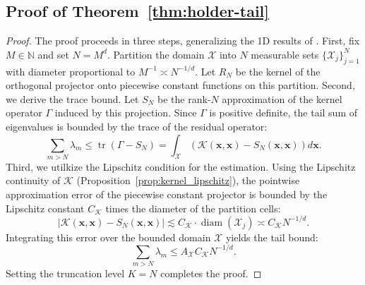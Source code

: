 \documentclass{article}
\theoremstyle{plain}
\theoremstyle{definition}
\theoremstyle{remark}
\begin{document}
\subsection{Proof of Theorem~\ref{thm:holder-tail}}
\begin{proof}The proof proceeds in three steps, generalizing the 1D results of \citet{reade1983eigen}.
First, fix $M \in \mathbb{N}$ and set $N = M^d$. 
Partition the domain $\mathcal{X}$ into $N$ measurable sets $\{\mathcal{X}_j\}_{j=1}^N$ with diameter proportional to $M^{-1} \asymp N^{-1/d}$. 
Let $R_N$ be the kernel of the orthogonal projector onto piecewise constant functions on this partition.
Second, we derive the trace bound.
Let $S_N$ be the rank-$N$ approximation of the kernel operator $\Gamma$ induced by this projection. Since $\Gamma$ is positive definite, the tail sum of eigenvalues is bounded by the trace of the residual operator:
$$\sum_{m > N} \lambda_m \le \operatorname{tr}(\Gamma - S_N) = \int_{\mathcal{X}} (\mathcal{K}(\bm{x}, \bm{x}) - S_N(\bm{x}, \bm{x})) d\bm{x}.$$
Third, we utilkize the Lipschitz condition for the estimation.
Using the Lipschitz continuity of $\mathcal{K}$ (Proposition~\ref{prop:kernel_lipschitz}), the pointwise approximation error of the piecewise constant projector is bounded by the Lipschitz constant $C_{\mathcal{K}}$ times the diameter of the partition cells:
$$|\mathcal{K}(\bm{x}, \bm{x}) - S_N(\bm{x}, \bm{x})| \lesssim C_{\mathcal{K}} \cdot \operatorname{diam}(\mathcal{X}_j) \asymp C_{\mathcal{K}} N^{-1/d}.$$
Integrating this error over the bounded domain $\mathcal{X}$ yields the tail bound:
$$\sum_{m > N} \lambda_m \le A_{\mathcal{X}} C_{\mathcal{K}} N^{-1/d}.$$
Setting the truncation level $K = N$ completes the proof.
\end{proof}
\end{document}
